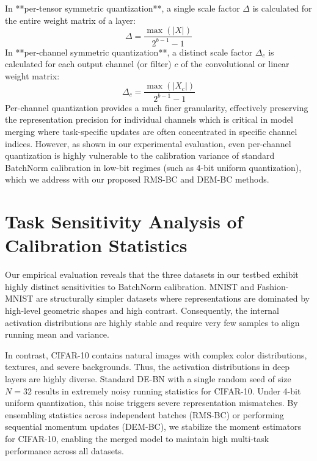 \documentclass{article}
\begin{document}
In **per-tensor symmetric quantization**, a single scale factor $\Delta$ is calculated for the entire weight matrix of a layer:
\begin{equation}
    \Delta = \frac{\max(|X|)}{2^{b-1} - 1}
\end{equation}
In **per-channel symmetric quantization**, a distinct scale factor $\Delta_c$ is calculated for each output channel (or filter) $c$ of the convolutional or linear weight matrix:
\begin{equation}
    \Delta_c = \frac{\max(|X_c|)}{2^{b-1} - 1}
\end{equation}
Per-channel quantization provides a much finer granularity, effectively preserving the representation precision for individual channels which is critical in model merging where task-specific updates are often concentrated in specific channel indices. However, as shown in our experimental evaluation, even per-channel quantization is highly vulnerable to the calibration variance of standard BatchNorm calibration in low-bit regimes (such as 4-bit uniform quantization), which we address with our proposed RMS-BC and DEM-BC methods.

\section{Task Sensitivity Analysis of Calibration Statistics}
Our empirical evaluation reveals that the three datasets in our testbed exhibit highly distinct sensitivities to BatchNorm calibration. MNIST and Fashion-MNIST are structurally simpler datasets where representations are dominated by high-level geometric shapes and high contrast. Consequently, the internal activation distributions are highly stable and require very few samples to align running mean and variance.

In contrast, CIFAR-10 contains natural images with complex color distributions, textures, and severe backgrounds. Thus, the activation distributions in deep layers are highly diverse. Standard DE-BN with a single random seed of size $N=32$ results in extremely noisy running statistics for CIFAR-10. Under 4-bit uniform quantization, this noise triggers severe representation mismatches. By ensembling statistics across independent batches (RMS-BC) or performing sequential momentum updates (DEM-BC), we stabilize the moment estimators for CIFAR-10, enabling the merged model to maintain high multi-task performance across all datasets.
\end{document}
